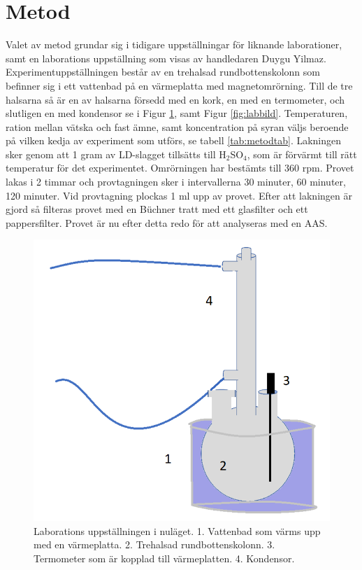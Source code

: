 \section{Metod}

 

Valet av metod grundar sig i tidigare uppställningar för liknande laborationer, samt en laborations uppställning som visas av handledaren Duygu Yilmaz\cite{Aarabi-Karasgani2010}. Experimentuppställningen består av en trehalsad rundbottenskolonn som befinner sig i ett vattenbad på en värmeplatta med magnetomrörning. Till de tre halsarna så är en av halsarna försedd med en kork, en med en termometer, och slutligen en med kondensor se i Figur \ref{fig:labupp}, samt Figur \ref{fig:labbild}. Temperaturen, ration mellan vätska och fast ämne, samt koncentration på syran väljs beroende på vilken kedja av experiment som utförs, se tabell \ref{tab:metodtab}. Lakningen sker genom att 1 gram av LD-slagget tillsätts till H$_{2}$SO$_{4}$, som är förvärmt till rätt temperatur för det experimentet. Omrörningen har bestämts till 360 rpm. Provet lakas i 2 timmar och provtagningen sker i intervallerna 30 minuter, 60 minuter, 120 minuter. Vid provtagning plockas 1 ml upp av provet. Efter att lakningen är gjord så filteras provet med en Büchner tratt med ett glasfilter och ett pappersfilter. Provet är nu efter detta redo för att analyseras med en AAS. 
\begin{figure}[H]
    \centering
    \includegraphics[scale=0.4]{labbupp.png}
    \caption{Laborations uppställningen i nuläget. 1. Vattenbad som värms upp med en värmeplatta. 2. Trehalsad rundbottenskolonn. 3. Termometer som är kopplad till värmeplatten. 4. Kondensor.    }
    \label{fig:labupp}
\end{figure}

